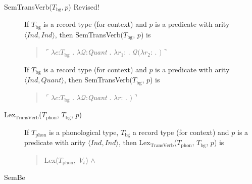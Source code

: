 \begin{description}
        
      \item[\textnormal{SemTransVerb($T_{\mathrm{bg}}, p$)} Revised!] \mbox{}

        If $T_{\text{bg}}$ is a record type (for context) and $p$ is a
        predicate with arity $\langle\textit{Ind},\textit{Ind}\rangle$, then SemTransVerb($T_{\mathrm{bg}}$, $p$) is
        \begin{quote}
          $\ulcorner\lambda c$:$T_{\mathrm{bg}}$ . $\lambda
          \mathcal{Q}$:\textit{Quant} . $\lambda
          r_1$: . $\mathcal{Q}(\lambda r_2$:
          . $)\urcorner$
        \end{quote}

        If $T_{\text{bg}}$ is a record type (for context) and $p$ is a
  predicate with arity $\langle\textit{Ind},\textit{Quant}\rangle$, then SemTransVerb($T_{\mathrm{bg}}$, $p$) is
  \begin{quote}
    $\ulcorner\lambda c$:$T_{\mathrm{bg}}$ . $\lambda
    \mathcal{Q}$:\textit{Quant} . $\lambda
    r$:
    . $)\urcorner$
  \end{quote}
        
\item[\textnormal{Lex$_{\mathrm{TransVerb}}$($T_{\mathrm{phon}}$,
          $T_{\mathrm{bg}}$, $p$)}] \mbox{}

        If $T_{\mathrm{phon}}$ is a phonological type,
        $T_{\mathrm{bg}}$ a record type (for context) and $p$ is a
        predicate with arity $\langle\textit{Ind},\textit{Ind}\rangle$, then Lex$_{\mathrm{TransVerb}}$($T_{\mathrm{phon}}$,
        $T_{\mathrm{bg}}$, $p$) is
        \begin{quote}
          Lex($T_{\mathrm{phon}}$, \textit{V$_t$}) \d{$\wedge$}
        \end{quote}

        

        
      \item[\textnormal{SemBe}] \mbox{}



\end{description}
